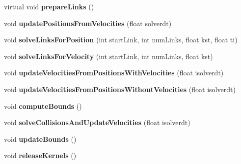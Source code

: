 \begin{DoxyCompactItemize}
virtual void {\bfseries prepare\+Links} ()
\item 
\mbox{\label{classbtDX11SoftBodySolver_ac76f41d29e21606203a3c571427fa6fc}} 
void {\bfseries update\+Positions\+From\+Velocities} (float solverdt)
\item 
\mbox{\label{classbtDX11SoftBodySolver_aacbf031c178776f7fcab836b02b269d9}} 
void {\bfseries solve\+Links\+For\+Position} (int start\+Link, int num\+Links, float kst, float ti)
\item 
\mbox{\label{classbtDX11SoftBodySolver_a369e42f30a6c6a1b7cab882e55fb6dd7}} 
void {\bfseries solve\+Links\+For\+Velocity} (int start\+Link, int num\+Links, float kst)
\item 
\mbox{\label{classbtDX11SoftBodySolver_a42608b88bf8addfe8709db7cc8d8af8c}} 
void {\bfseries update\+Velocities\+From\+Positions\+With\+Velocities} (float isolverdt)
\item 
\mbox{\label{classbtDX11SoftBodySolver_a5c8e0ffc26b8f0091abd14112fb2b671}} 
void {\bfseries update\+Velocities\+From\+Positions\+Without\+Velocities} (float isolverdt)
\item 
\mbox{\label{classbtDX11SoftBodySolver_a256c52023e8affaac8f309376b92c5e5}} 
void {\bfseries compute\+Bounds} ()
\item 
\mbox{\label{classbtDX11SoftBodySolver_ad5e290cbde6331e1efe917ae2d8ebf34}} 
void {\bfseries solve\+Collisions\+And\+Update\+Velocities} (float isolverdt)
\item 
\mbox{\label{classbtDX11SoftBodySolver_a99d25abbd7214746d3f3bf2bb9d0be77}} 
void {\bfseries update\+Bounds} ()
\item 
\mbox{\label{classbtDX11SoftBodySolver_ab48ddcf852021890fad6875a140ecd24}} 
void {\bfseries release\+Kernels} ()
\end{DoxyCompactItemize}
